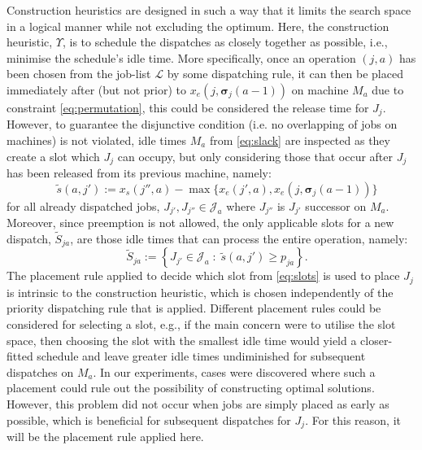 \documentclass[twocolumn]{svjour3}
\newcommand{\vsigma}{\bm \sigma}
\begin{document}
Construction heuristics are designed in such a way that it limits the search 
space in a logical manner while not excluding the optimum. Here, the 
construction heuristic, $\Upsilon$, is to schedule the dispatches as closely 
together as possible, i.e., minimise the schedule's idle time. 
More specifically, once an operation $(j,a)$ has been chosen from the job-list 
$\mathcal{L}$ by some dispatching rule, it can then be placed immediately after 
(but not prior) to $x_e(j,\vsigma_j(a-1))$ on machine $M_a$ due to constraint 
\cref{eq:permutation}, this could be considered the release time for $J_j$. 
However, to guarantee the disjunctive condition (i.e. no overlapping of jobs on 
machines) is not violated, idle times $M_a$ from \cref{eq:slack} are inspected 
as they create a slot which $J_j$ can occupy, but only considering those that 
occur after $J_j$ has been released from its previous machine, namely:
\begin{equation}\quad
\tilde{s}(a,j'):= x_s(j'',a)-\max\{x_e(j',a),x_e(j,\vsigma_j(a-1))\} 
\end{equation}
for all already dispatched jobs, $J_{j'},J_{j''}\in \mathcal{J}_a$ where 
$J_{j''}$ is $J_{j'}$ successor on $M_a$. Moreover, since preemption is not 
allowed, the only applicable slots for a new dispatch, $\tilde{S}_{ja}$, are 
those idle times that can process the entire operation, namely:
\begin{equation}\quad
\tilde{S}_{ja} := 
\left\{J_{j'}\in \mathcal{J}_a \;:\; \tilde{s}(a,j')\geq p_{ja} \right\}
\label{eq:slots}. \end{equation} 
The placement rule applied to decide which slot from \cref{eq:slots} is used to 
place $J_j$ is intrinsic to the construction heuristic, which is chosen 
independently of the priority dispatching rule that is applied. 
Different placement rules could be considered for selecting a slot, e.g., if 
the main concern were to utilise the slot space, then choosing the slot with 
the smallest idle time would yield a closer-fitted schedule and leave greater 
idle times undiminished for subsequent dispatches on $M_a$.
In our experiments, cases were discovered where such a placement could rule out 
the possibility of constructing optimal solutions.
However, this problem did not occur when jobs are simply placed as early as 
possible, which is beneficial for subsequent dispatches for $J_j$. 
For this reason, it will be the placement rule applied here.
\end{document}
